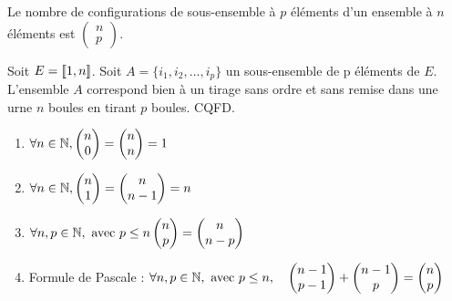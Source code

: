 \documentclass{book}
\begin{document}
\begin{Corollaire}
Le nombre de configurations de sous-ensemble à $p$ éléments d'un ensemble à $n$ éléments est $\begin{pmatrix}n\\p\end{pmatrix}$.
\end{Corollaire}
\begin{Demonstration}Soit $E=\mathopen\lbrack\!\lbrack1,n \mathclose\rbrack\!\rbrack$. Soit $A=\{i_1,i_2,\dots,i_p\}$ un sous-ensemble de p éléments de $E$. L'ensemble $A$ correspond bien à un tirage sans ordre et sans remise dans une urne $n$ boules en tirant $p$ boules. CQFD. 
\end{Demonstration}




\begin{Proposition}
\begin{enumerate}
\item $\forall n \in \mathbb{N}, \begin{pmatrix}n\\0\end{pmatrix}=\begin{pmatrix}n\\n\end{pmatrix}=1$
\item $\forall n \in \mathbb{N}, \begin{pmatrix}n\\1\end{pmatrix}=\begin{pmatrix}n\\n-1\end{pmatrix}=n$
\item $\forall n,p \in \mathbb{N},\text{ avec }p\leq n \begin{pmatrix}n\\p\end{pmatrix}=\begin{pmatrix}n\\n-p\end{pmatrix}$
\item Formule de Pascale : $\forall n,p \in \mathbb{N},\text{ avec }p\leq n, \quad \begin{pmatrix}n-1\\p-1\end{pmatrix}+\begin{pmatrix}n-1\\p\end{pmatrix}=\begin{pmatrix}n\\p\end{pmatrix}$
\end{enumerate}
\end{Proposition}
\end{document}
